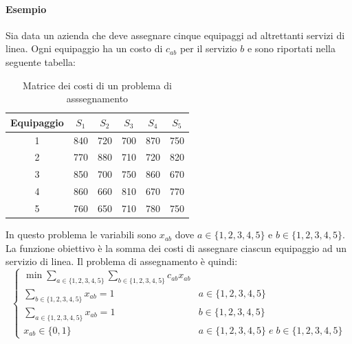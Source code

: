 \documentclass{article}
\begin{document}
\paragraph{Esempio}
Sia data un azienda che deve assegnare cinque equipaggi ad altrettanti servizi 
di linea. Ogni equipaggio ha un costo di $c_{ab}$ per il servizio $b$ e sono 
riportati nella seguente tabella:

\begin{table}
  \center
  \begin{tabular}
  { |c|c|c|c|c|c| }
    \hline
    Equipaggio & $S_1$ & $S_2$ & $S_3$ & $S_4$ & $S_5$ \\
    \hline
    1 & 840 & 720 & 700 & 870 & 750 \\ 
    2 & 770 & 880 & 710 & 720 & 820 \\ 
    3 & 850 & 700 & 750 & 860 & 670 \\ 
    4 & 860 & 660 & 810 & 670 & 770 \\ 
    5 & 760 & 650 & 710 & 780 & 750 \\ 
    \hline
  \end{tabular}
  \caption{Matrice dei costi di un problema di asssegnamento}
  \label{tab:eqp_vincoli}
\end{table}

In questo problema le variabili sono $x_{ab}$ dove $a \in \{1,2,3,4,5\}$ e $b 
\in \{1,2,3,4,5\}$. La funzione obiettivo è la somma dei costi di assegnare 
ciascun equipaggio ad un servizio di linea. Il problema di assegnamento è 
quindi:
\begin{equation*}
  \begin{cases}
    \min \sum_{a \in \{1,2,3,4,5\}} \sum_{b \in \{1,2,3,4,5\}} c_{ab}x_{ab} \\
    \sum_{b \in \{1,2,3,4,5\}} x_{ab} = 1 & a \in \{1,2,3,4,5\} \\
    \sum_{a \in \{1,2,3,4,5\}} x_{ab} = 1 & b \in \{1,2,3,4,5\} \\
    x_{ab} \in \{0,1\} & a \in \{1,2,3,4,5\} \; e \; b \in \{1,2,3,4,5\}
  \end{cases}
\end{equation*}
\end{document}
